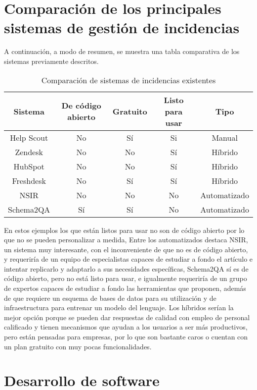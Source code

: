  \section{Comparación de los principales sistemas de gestión de incidencias}
 
 A continuación, a modo de resumen, se muestra una tabla comparativa de los sistemas previamente descritos.\newline
 
\begin{table}[h]
	 \begin{tabular}{| c | c | c | c | c |}
		\hline
		Sistema & De código abierto & Gratuito & Listo para usar & Tipo \\ \hline
		Help Scout & No & Sí & Si & Manual \\ \hline 
		Zendesk & No & No & Sí & Híbrido \\ \hline
		HubSpot & No & No & Sí & Híbrido \\ \hline
		Freshdesk & No & Sí & Sí & Híbrido \\ \hline
		NSIR & No & No & No & Automatizado \\ \hline
		Schema2QA & Sí & Sí & No & Automatizado \\ \hline
		
	\end{tabular}
\caption{Comparación de sistemas de incidencias existentes}
\label{Sistemas de incidencias}
\end{table}

En estos ejemplos los que están listos para usar no son de código abierto por lo que no se pueden personalizar a medida,  Entre los automatizados destaca NSIR, un sistema muy interesante, con el inconveniente de que no es de código abierto, y requeriría de un equipo de especialistas capaces de estudiar a fondo el artículo e intentar replicarlo y adaptarlo a sus necesidades específicas, Schema2QA sí es de código abierto, pero no está listo para usar, e igualmente requeriría de un grupo de expertos capaces de estudiar a fondo las herramientas que proponen, además de que requiere un esquema de bases de datos para su utilización y de infraestructura para entrenar un modelo del lenguaje. Los híbridos serían la mejor opción porque se pueden dar respuestas de calidad con empleo de personal calificado y tienen mecanismos que ayudan a los usuarios a ser más productivos, pero están pensadas para empresas, por lo que son bastante caros o cuentan con un plan gratuito con muy pocas funcionalidades.

\section{Desarrollo de software}


